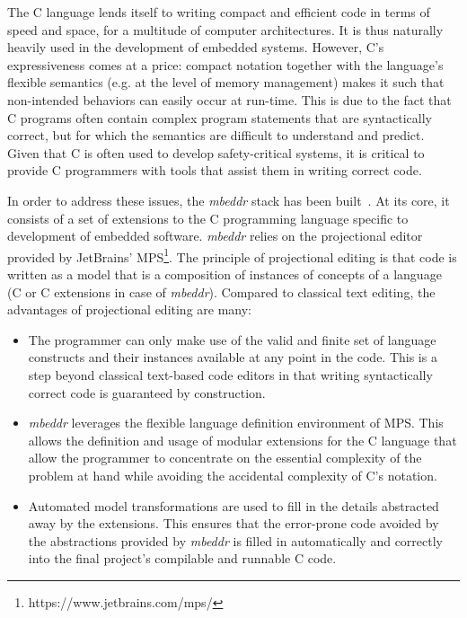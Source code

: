 The C language lends itself to writing compact and efficient code in terms of
speed and space, for a multitude of computer architectures. It is thus naturally
heavily used in the development of embedded systems. However, C's expressiveness
comes at a price: compact notation together with the language's flexible
semantics (e.g. at the level of memory management) makes it such that
non-intended behaviors can easily occur at run-time. This is due to the fact
that C programs often contain complex program statements that are syntactically
correct, but for which the semantics are difficult to understand and predict. Given that C is
often used to develop safety-critical systems, it is critical to provide
C programmers with tools that assist them in writing correct code.

In order to address these issues, the \emph{mbeddr} stack 
has been built~\cite{VoelterRKS13}. At its core, it consists of a set of
extensions to the C programming language specific to development of embedded
software. \emph{mbeddr} relies on the projectional editor provided
by JetBrains' MPS\footnote{https://www.jetbrains.com/mps/}.
The principle of projectional editing is that code is written as a model that is
a composition of instances of concepts of a language (C or C extensions in case
of \emph{mbeddr}). Compared to classical text editing, the advantages of projectional
editing are many:

\begin{itemize}
  \item The programmer can only make use of the valid and finite set of language
  constructs and their instances available at any point in the code. This is a
  step beyond classical text-based code editors in that writing syntactically
  correct code is guaranteed by construction.
  \item \emph{mbeddr} leverages the flexible language definition environment of
  MPS. This allows the definition and usage of modular extensions for the C
  language that allow the programmer to concentrate on the essential complexity of the problem
  at hand while avoiding the accidental complexity of C's notation.
  \item Automated model transformations are used to fill in the
  details abstracted away by the extensions. This ensures that the error-prone
  code avoided by the abstractions provided by \emph{mbeddr} is filled in automatically
  and correctly into the final project's compilable and runnable C code.
\end{itemize}
